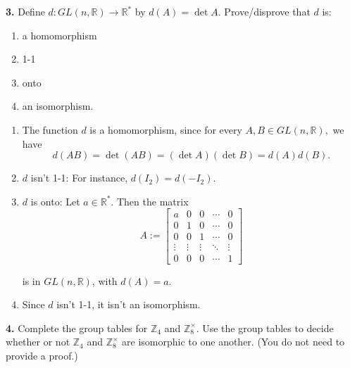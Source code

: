 \documentclass[10pt,]{book}
\theoremstyle{plain}
\theoremstyle{definition}
\theoremstyle{definition}
\theoremstyle{definition}
\theoremstyle{definition}
\numberwithin{equation}{section}
\def\Z{\mathbb{Z}}
\def\R{\mathbb{R}}
\newcommand{\amp}{ & }
\begin{document}
\par\smallskip
\noindent\textbf{3.}\quad{}
        Define \(d : GL(n,\R)\to \R^*\) by \(d(A)=\det A\). Prove/disprove that \(d\) is:
        \leavevmode%
\begin{enumerate}[label=(\alph*)]
\item\hypertarget{li-174}{}
              a homomorphism
\item\hypertarget{li-175}{}
              1-1
\item\hypertarget{li-176}{}
              onto
\item\hypertarget{li-177}{}
              an isomorphism.
\end{enumerate}

\par\smallskip
\leavevmode%
\begin{enumerate}[label=(\alph*)]
\item\hypertarget{li-178}{}
          The function \(d\) is a homomorphism, since for every \(A,B \in
          GL(n,\R),\) we have
\begin{equation*}

            d(AB)=\det(AB)=(\det A)(\det B)=d(A)d(B).
          
\end{equation*}

\item\hypertarget{li-179}{}
          \(d\) isn't 1-1: For instance, \(d(I_2)=d(-I_2)\).
\item\hypertarget{li-180}{}
          \(d\) is onto: Let \(a\in \R^*\). Then the matrix
\begin{equation*}

            A:=\begin{bmatrix}a \amp  0 \amp  0 \amp  \cdots \amp  0 \\
            0 \amp  1 \amp  0 \amp  \cdots \amp  0 \\
            0 \amp  0 \amp  1 \amp  \cdots \amp  0 \\
            \vdots \amp  \vdots \amp  \vdots \amp  \ddots \amp  \vdots \\
            0 \amp  0 \amp  0 \amp  \cdots \amp  1
            \end{bmatrix}
          
\end{equation*}

          is in \(GL(n,\R)\), with \(d(A)=a\).
\item\hypertarget{li-181}{}
          Since \(d\) isn't 1-1, it isn't  an
          isomorphism.
\end{enumerate}
\par\smallskip
\noindent\textbf{4.}\quad{}
        Complete the group tables for \(\Z_4\) and \(\Z_8^{\times}\). Use the group tables to decide whether or not \(\Z_4\) and \(\Z_8^{\times}\) are isomorphic to one another. (You do not need to provide a proof.)
\par\smallskip
\end{document}
